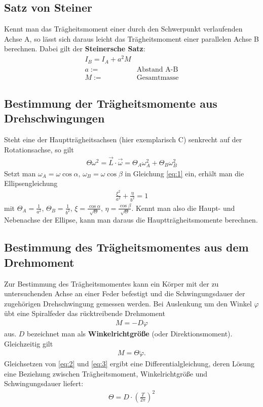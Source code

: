 \subsection{Satz von Steiner}
Kennt man das Trägheitsmoment einer durch den Schwerpunkt verlaufenden Achse A, so lässt sich daraus leicht das Trägheitsmoment einer parallelen Achse B berechnen. Dabei gilt der \textbf{Steinersche Satz}:
\begin{align}
I_B=I_A+a^2M\\
a:=& \text{Abstand A-B}\nonumber\\
M:=& \text{Gesamtmasse}\nonumber
\end{align}
\subsection{Bestimmung der Trägheitsmomente aus Drehschwingungen}
Steht eine der Hauptträgheitsachsen (hier exemplarisch C) senkrecht auf der Rotationsachse, so gilt
\begin{align}
\label{eq:1}
\Theta\omega^2=\vec{L}\cdot\vec{\omega}=\Theta_A\omega^2_A+\Theta_B\omega^2_B
\end{align}
Setzt man $\omega_A=\omega\cos{\alpha}, \, \omega_B=\omega\cos{\beta}$ in Gleichung \ref{eq:1} ein, erhält man die Ellipsengleichung
\begin{align}
\frac{\xi^2}{a^2}+\frac{\eta}{b^2}=1
\end{align}
mit $\Theta_A=\frac{1}{a^2}, \, \Theta_B=\frac{1}{b^2}, \, \xi=\frac{\cos{\alpha}}{\sqrt{\Theta}}, \, \eta=\frac{\cos{\beta}}{\sqrt{\Theta}}$. Kennt man also die Haupt- und Nebenachse der Ellipse, kann man daraus die Hauptträgheitsmomente berechnen.
\subsection{Bestimmung des Trägheitsmomentes aus dem Drehmoment}
Zur Bestimmung des Trägheitsmomentes kann ein Körper mit der zu untersuchenden Achse an einer Feder befestigt und die Schwingungsdauer der zugehörigen Drehschwingung gemessen werden. Bei Auslenkung um den Winkel $\varphi$ übt eine Spiralfeder das rücktreibende Drehmoment
\begin{align}
\label{eq:2}
M=-D\varphi
\end{align}
aus. $D$ bezeichnet man als \textbf{Winkelrichtgröße} (oder Direktionsmoment). Gleichzeitig gilt
\begin{align}
\label{eq:3}
M=\Theta\ddot{\varphi}.
\end{align}
Gleichsetzen von \ref{eq:2} und \ref{eq:3} ergibt eine Differentialgleichung, deren Lösung eine Beziehung zwischen Trägheitsmoment, Winkelrichtgröße und Schwingungsdauer liefert:
\begin{align}
\Theta=D\cdot\left(\frac{T}{2\pi}\right)^2
\end{align}
